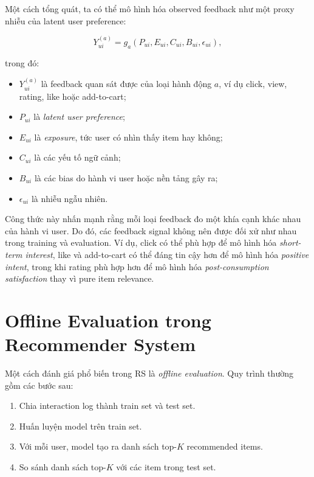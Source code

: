 \documentclass[12pt,a4paper]{article}
\begin{document}
Một cách tổng quát, ta có thể mô hình hóa observed feedback như một proxy nhiễu của latent user preference:

\begin{equation}
Y_{ui}^{(a)} = g_a(P_{ui}, E_{ui}, C_{ui}, B_{ui}, \epsilon_{ui}),
\end{equation}

trong đó:

\begin{itemize}[leftmargin=*]
    \item $Y_{ui}^{(a)}$ là feedback quan sát được của loại hành động $a$, ví dụ click, view, rating, like hoặc add-to-cart;
    \item $P_{ui}$ là \textit{latent user preference};
    \item $E_{ui}$ là \textit{exposure}, tức user có nhìn thấy item hay không;
    \item $C_{ui}$ là các yếu tố ngữ cảnh;
    \item $B_{ui}$ là các bias do hành vi user hoặc nền tảng gây ra;
    \item $\epsilon_{ui}$ là nhiễu ngẫu nhiên.
\end{itemize}

Công thức này nhấn mạnh rằng mỗi loại feedback đo một khía cạnh khác nhau của hành vi user. 
Do đó, các feedback signal không nên được đối xử như nhau trong training và evaluation. 
Ví dụ, click có thể phù hợp để mô hình hóa \textit{short-term interest}, like và add-to-cart có thể đáng tin cậy hơn để mô hình hóa \textit{positive intent}, trong khi rating phù hợp hơn để mô hình hóa \textit{post-consumption satisfaction} thay vì pure item relevance.

\section{Offline Evaluation trong Recommender System}

Một cách đánh giá phổ biến trong RS là \textit{offline evaluation}. 
Quy trình thường gồm các bước sau:

\begin{enumerate}[leftmargin=*]
    \item Chia interaction log thành train set và test set.
    \item Huấn luyện model trên train set.
    \item Với mỗi user, model tạo ra danh sách top-$K$ recommended items.
    \item So sánh danh sách top-$K$ với các item trong test set.
\end{enumerate}
\end{document}
